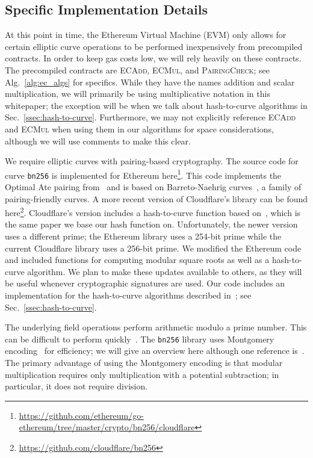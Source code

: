 \subsection{Specific Implementation Details}
\label{ssec:pk_curve_specifics}

At this point in time, the Ethereum Virtual Machine (EVM) 
only allows for certain elliptic curve operations to
be performed inexpensively from precompiled contracts.
In order to keep gas costs low, we will rely heavily 
on these contracts.
The precompiled contracts are
\textsc{ECAdd}, \textsc{ECMul}, and \textsc{PairingCheck};
see Alg.~\ref{alg:ec_algs} for specifics.
While they have the names addition and scalar multiplication,
we will primarily be using multiplicative notation in this whitepaper;
the exception will be when we talk about hash-to-curve algorithms
in Sec.~\ref{ssec:hash-to-curve}.
Furthermore, we may not explicitly reference \textsc{ECAdd}
and \textsc{ECMul} when using them in our algorithms
for space considerations, although we will use comments to make
this clear.



We require elliptic curves with pairing-based cryptography.
The source code for curve \texttt{bn256} is implemented
for Ethereum here\footnote{
\url{https://github.com/ethereum/go-ethereum/tree/master/crypto/bn256/cloudflare}
}.
This code implements the Optimal Ate pairing from~\cite{naehrig2010new} and
is based on Barreto-Naehrig curves~\cite{bnCurves},
a family of pairing-friendly curves.
A more recent version of Cloudflare's library can be found here\footnote{
\url{https://github.com/cloudflare/bn256}}.
Cloudflare's version includes a hash-to-curve function
based on~\cite{ft2012bnhashtocurve}, which is the same paper we base our
hash function on.
Unfortunately, the newer version uses a different prime;
the Ethereum library uses a 254-bit prime while the current Cloudflare
library uses a 256-bit prime.
We modified the Ethereum code
and included functions for computing modular square roots as
well as a hash-to-curve algorithm.
We plan to make these updates available to others, as they will
be useful whenever cryptographic signatures are used.
Our code includes an implementation for the hash-to-curve algorithms
described in~\cite{ft2012bnhashtocurve}; see Sec.~\ref{ssec:hash-to-curve}.

The underlying field operations perform arithmetic modulo a prime number.
This can be difficult to perform quickly~\cite[Chapter 14]{hac1996}.
The \texttt{bn256} library uses Montgomery
encoding~\cite{montgomery1985modular} for efficiency;
we will give an overview here although one reference
is~\cite[Chapter 14.3.2]{hac1996}.
The primary advantage of using the Montgomery encoding is that
modular multiplication requires only multiplication with a potential
subtraction; in particular, it does not require division.

